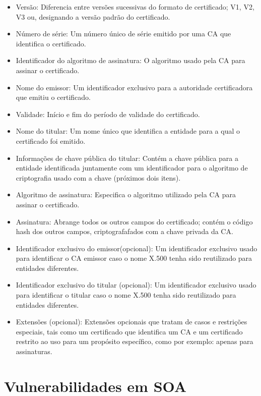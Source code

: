 \begin{itemize}

\item Versão: Diferencia entre versões sucessivas do formato de certificado; V1, V2, V3 ou, designando a versão padrão do certificado.

\item Número de série: Um número único de série emitido por uma CA que identifica o certificado.
\item Identificador do algoritmo de assinatura: O algoritmo usado pela CA para assinar o certificado.
\item Nome do emissor: Um identificador exclusivo para a autoridade certificadora que emitiu o certificado.
\item Validade: Início e fim do período de validade do certificado.
\item Nome do titular:  Um nome único que identifica a entidade para a qual o certificado foi emitido.
\item Informações de chave pública do titular: Contém a chave pública para a entidade identificada juntamente com um identificador para o algoritmo de criptografia usado com a chave (próximos dois itens).
\item Algoritmo de assinatura: Especifica o algoritmo utilizado pela CA para assinar o certificado.
\item Assinatura: Abrange todos os outros campos do certificado; contém o código hash dos outros campos, criptografafados com a chave privada da CA.
\item Identificador exclusivo do emissor(opcional): Um identificador exclusivo usado para identificar o CA emissor caso o nome X.500 tenha sido reutilizado para entidades diferentes.
\item Identificador exclusivo do titular (opcional): Um identificador exclusivo usado para identificar o titular caso o nome X.500 tenha sido reutilizado para entidades diferentes.
\item Extensões (opcional): Extensões opcionais que tratam de casos e restrições especiais, tais como um certificado que identifica um CA e um certificado restrito ao uso para um propósito específico, como por exemplo: apenas para assinaturas.

\end{itemize}




\section{Vulnerabilidades em SOA}\label{sec:vulnerabilidadessoa}

